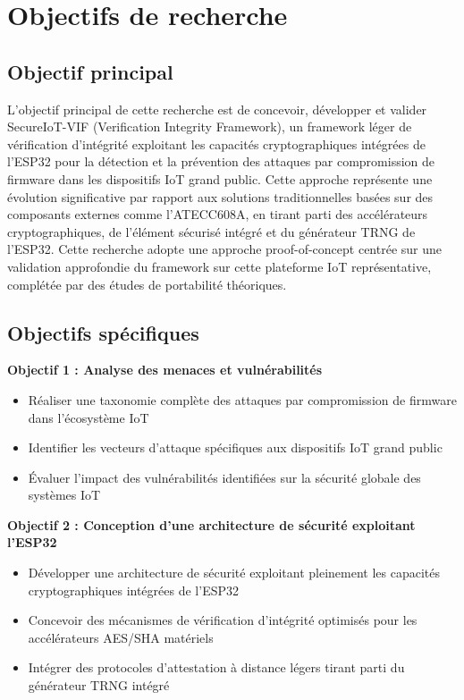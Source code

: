 \section{Objectifs de recherche}

\subsection{Objectif principal}

L'objectif principal de cette recherche est de concevoir, développer et valider SecureIoT-VIF (Verification Integrity Framework), un framework léger de vérification d'intégrité exploitant les capacités cryptographiques intégrées de l'ESP32 pour la détection et la prévention des attaques par compromission de firmware dans les dispositifs IoT grand public. Cette approche représente une évolution significative par rapport aux solutions traditionnelles basées sur des composants externes comme l'ATECC608A, en tirant parti des accélérateurs cryptographiques, de l'élément sécurisé intégré et du générateur TRNG de l'ESP32. Cette recherche adopte une approche proof-of-concept centrée sur une validation approfondie du framework sur cette plateforme IoT représentative, complétée par des études de portabilité théoriques.

\subsection{Objectifs spécifiques}

\textbf{Objectif 1 : Analyse des menaces et vulnérabilités}
\begin{itemize}
    \item Réaliser une taxonomie complète des attaques par compromission de firmware dans l'écosystème IoT
    \item Identifier les vecteurs d'attaque spécifiques aux dispositifs IoT grand public
    \item Évaluer l'impact des vulnérabilités identifiées sur la sécurité globale des systèmes IoT
\end{itemize}

\textbf{Objectif 2 : Conception d'une architecture de sécurité exploitant l'ESP32}
\begin{itemize}
    \item Développer une architecture de sécurité exploitant pleinement les capacités cryptographiques intégrées de l'ESP32
    \item Concevoir des mécanismes de vérification d'intégrité optimisés pour les accélérateurs AES/SHA matériels
    \item Intégrer des protocoles d'attestation à distance légers tirant parti du générateur TRNG intégré
\end{itemize}

